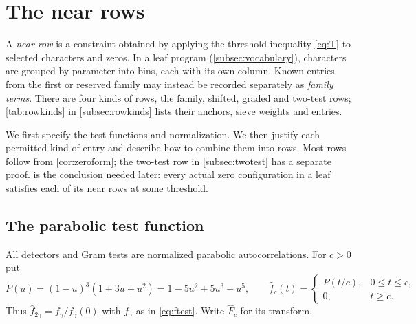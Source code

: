 \section{The near rows}\label{sec:rows}

A \emph{near row} is a constraint obtained by applying the threshold inequality
\eqref{eq:T} to selected characters and zeros. In a leaf program (\cref{subsec:vocabulary}),
characters are grouped by parameter into bins, each with its own column. Known entries from the
first or reserved family may instead be recorded separately as \emph{family terms}. There are
four kinds of rows, the family, shifted, graded and two-test rows; \cref{tab:rowkinds} in
\cref{subsec:rowkinds} lists their anchors, sieve weights and entries.

We first specify the test functions and normalization. We then justify each permitted
kind of entry and describe how to combine them into rows. Most rows follow from
\cref{cor:zeroform}; the two-test row in \cref{subsec:twotest} has a separate proof.
 is the conclusion needed later: every actual zero configuration
in a leaf satisfies each of its near rows at some threshold.

\subsection{The parabolic test function}
All detectors and Gram tests are normalized parabolic autocorrelations. For $c>0$ put
\[
  P(u)=(1-u)^3(1+3u+u^2)=1-5u^2+5u^3-u^5,\qquad
  \hat f_c(t)=\begin{cases}P(t/c),&0\le t\le c,\\0,&t\ge c.\end{cases}
\]
Thus $\hat f_{2\gamma}=f_\gamma/f_\gamma(0)$ with $f_\gamma$ as in \eqref{eq:ftest}. Write $\hat F_c$ for its
transform.

